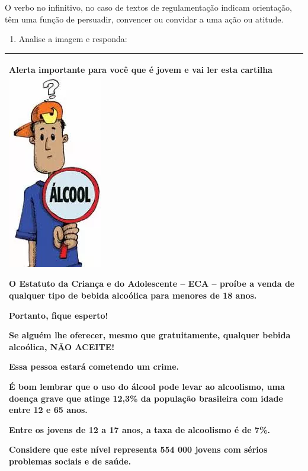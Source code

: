 O verbo no infinitivo, no caso de textos de regulamentação indicam
orientação, têm uma função de persuadir, convencer ou convidar a uma
ação ou atitude.

\begin{enumerate}
\def\labelenumi{\arabic{enumi})}
\setcounter{enumi}{5}
\tightlist
\item
  Analise a imagem e responda:
\end{enumerate}

\begin{longtable}[]{@{}
  >{\raggedright\arraybackslash}p{}@{}}
\toprule
\endhead
\textbf{Alerta importante para você que é jovem e vai ler esta
cartilha}\includegraphics[width=1.625in,height=3.36458in]{./imgSAEB_7_POR/media/image2.png}

O Estatuto da Criança e do Adolescente -- ECA -- proíbe a venda de
qualquer tipo de bebida alcoólica para menores de 18 anos.

Portanto, fique esperto!

Se alguém lhe oferecer, mesmo que gratuitamente, qualquer bebida
alcoólica, NÃO ACEITE!

Essa pessoa estará cometendo um crime.

É bom lembrar que o uso do álcool pode levar ao alcoolismo, uma doença
grave que atinge 12,3\% da população brasileira com idade entre 12 e 65
anos.

Entre os jovens de 12 a 17 anos, a taxa de alcoolismo é de 7\%.

Considere que este nível representa 554 000 jovens com sérios problemas
sociais e de saúde. \\
\bottomrule
\end{longtable}

